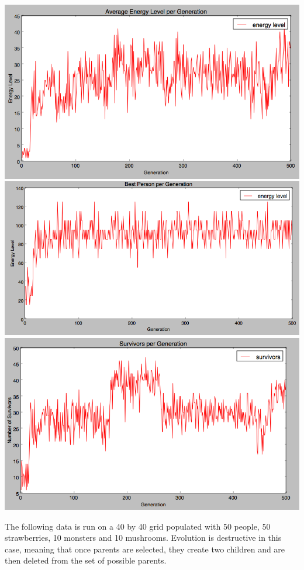 \documentclass{article}
\begin{document}
\includegraphics[width=1.25\textwidth]{40non_avg_energy}
\includegraphics[width=1\textwidth]{40non_best}
\includegraphics[width=1\textwidth]{40non_survivors}

The following data is run on a 40 by 40 grid populated with 50 people, 50 strawberries, 10 monsters and 10 mushrooms.  Evolution is destructive in this case, meaning that once parents are selected, they create two children and are then deleted from the set of possible parents.
\end{document}

